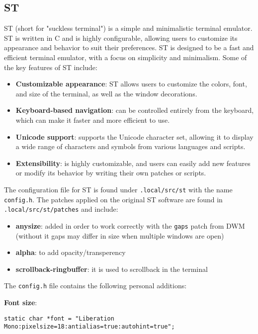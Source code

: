 \documentclass{article}
\begin{document}
\subsection{ST}

ST (short for "suckless terminal") is a simple and minimalistic terminal emulator.
ST is written in C and is highly configurable, allowing users to customize its appearance and behavior to suit their preferences.
\newline
\newline
ST is designed to be a fast and efficient terminal emulator, with a focus on simplicity and minimalism. Some of the key features of ST include:
\begin{itemize}
	\item \textbf{Customizable appearance}: ST allows users to customize the colors, font, and size of the terminal, as well as the window decorations.
	\item \textbf{Keyboard-based navigation}: can be controlled entirely from the keyboard, which can make it faster and more efficient to use.
	\item \textbf{Unicode support}: supports the Unicode character set, allowing it to display a wide range of characters and symbols from various languages and scripts.
	\item \textbf{Extensibility}: is highly customizable, and users can easily add new features or modify its behavior by writing their own patches or scripts.
\end{itemize}

\noindent The configuration file for ST is found under \texttt{.local/src/st} with the name \texttt{config.h}. The patches applied on the original ST software are found in \texttt{.local/src/st/patches} and include:
\begin{itemize}
	\item \textbf{anysize}: added in order to work correctly with the \texttt{gaps} patch from DWM (without it gaps may differ in size when multiple windows are open)
	\item \textbf{alpha}: to add opacity/transperency
	\item \textbf{scrollback-ringbuffer}: it is used to scrollback in the terminal  
\end{itemize}

\noindent The \texttt{config.h} file contains the following personal additions: 
\newline

\noindent\textbf{Font size}:
\begin{lstlisting}
static char *font = "Liberation Mono:pixelsize=18:antialias=true:autohint=true";
\end{lstlisting}
\end{document}
